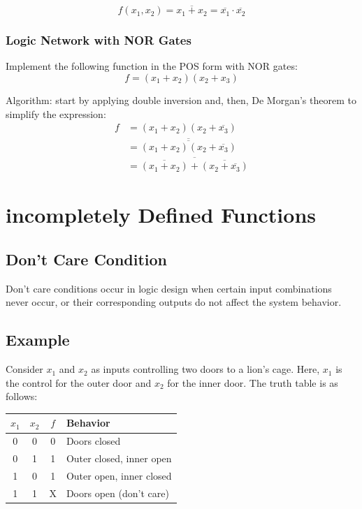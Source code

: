\documentclass[12pt,openany, tikz,border=10pt]{book}
\begin{document}
			      	$$f(x_1, x_2) = \overline{x_1 + x_2} = \overline{x_1} \cdot \overline{x_2}$$
			      	
			      	        
			      	
			      	\subsubsection*{Logic Network with NOR Gates}
			      	Implement the following function in the POS form with NOR gates:
			      	\begin{equation}
			      		f = (x_1 + x_2)(x_2 + x_3)
			      	\end{equation}
			      	
			      	Algorithm: start by applying double inversion and, then, De Morgan's theorem to simplify the expression:
			      	\begin{align}
			      		f & = (x_1 + x_2)(x_2 + \overline{x_3})                                     \\
			      		  & = \overline{\overline{(x_1 + x_2)(x_2 + \overline{x_3})}}               \\
			      		  & = \overline{\overline{(x_1 + x_2)} + \overline{(x_2 + \overline{x_3})}} 
			      	\end{align}
			      	\section{incompletely Defined Functions}
			      	\subsection{Don't Care Condition}
			      	Don't care conditions occur in logic design when certain input combinations never occur, or their corresponding outputs do not affect the system behavior. 
			      	
			      	\subsection{Example}
			      	Consider \( x_1 \) and \( x_2 \) as inputs controlling two doors to a lion's cage. Here, \( x_1 \) is the control for the outer door and \( x_2 \) for the inner door. The truth table is as follows:
			      	
			      	\begin{center}
			      		\begin{tabular}{cc|c|l}
			      			\( x_1 \) & \( x_2 \) & \( f \) & Behavior                 \\
			      			\hline
			      			0         & 0         & 0       & Doors closed             \\
			      			0         & 1         & 1       & Outer closed, inner open \\
			      			1         & 0         & 1       & Outer open, inner closed \\
			      			1         & 1         & X       & Doors open (don't care)  \\
			      		\end{tabular}
			      	\end{center}
			      	
\end{document}
